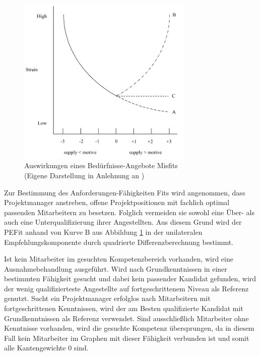 \begin{figure}[h]
	\centering
	\includegraphics[width=0.75\textwidth]{gfx/ueberschuss_supply_motive.png}
	\caption{Auswirkungen eines Bedürfnisse-Angebote Misfits\\(Eigene Darstellung in Anlehnung an \cite[S. 23]{edwards:2008})}
	\label{fig:methodik:versuchsaufbau:unilateral:abb2}
\end{figure}

Zur Bestimmung des Anforderungen-Fähigkeiten Fits wird angenommen, dass Projektmanager anstreben, offene Projektpositionen mit fachlich optimal passenden Mitarbeitern zu besetzen. Folglich vermeiden sie sowohl eine Über- als auch eine Unterqualifizierung ihrer Angestellten. Aus diesem Grund wird der \ac{PEFit} anhand von Kurve B aus Abbildung \ref{fig:methodik:versuchsaufbau:unilateral:abb2} in der unilateralen Empfehlungskomponente durch quadrierte Differenzberechnung bestimmt.

Ist kein Mitarbeiter im gesuchten Kompetenzbereich vorhanden, wird eine Ausnahmebehandlung ausgeführt. Wird nach Grundkenntnissen in einer bestimmten Fähigkeit gesucht und dabei kein passender Kandidat gefunden, wird der wenig qualifizierteste Angestellte auf fortgeschrittenem Niveau als Referenz genutzt. Sucht ein Projektmanager erfolglos nach Mitarbeitern mit fortgeschrittenen Kenntnissen, wird der am Besten qualifizierte Kandidat mit Grundkenntnissen als Referenz verwendet. Sind ausschließlich Mitarbeiter ohne Kenntnisse vorhanden, wird die gesuchte Kompetenz übersprungen, da in diesem Fall kein Mitarbeiter im Graphen mit dieser Fähigkeit verbunden ist und somit alle Kantengewichte 0 sind.

